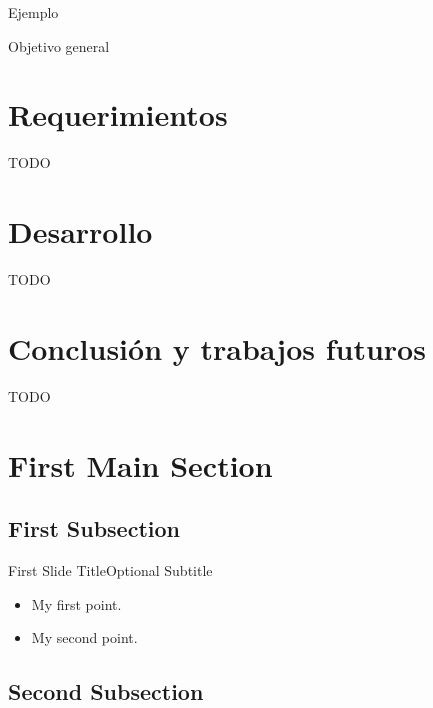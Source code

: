\documentclass{beamer}
\begin{document}
\begin{frame}{Ejemplo}{}

\end{frame}

\begin{frame}{Objetivo general}{}
\end{frame}

\section{Requerimientos}
\begin{frame}{TODO}{}

\end{frame}

\section{Desarrollo}
\begin{frame}{TODO}{}

\end{frame}

\section{Conclusión y trabajos futuros}
\begin{frame}{TODO}{}

\end{frame}

\section{First Main Section}

\subsection{First Subsection}

\begin{frame}{First Slide Title}{Optional Subtitle}
  \begin{itemize}
  \item {
    My first point.
  }
  \item {
    My second point.
  }
  \end{itemize}
\end{frame}

\subsection{Second Subsection}
\end{document}
